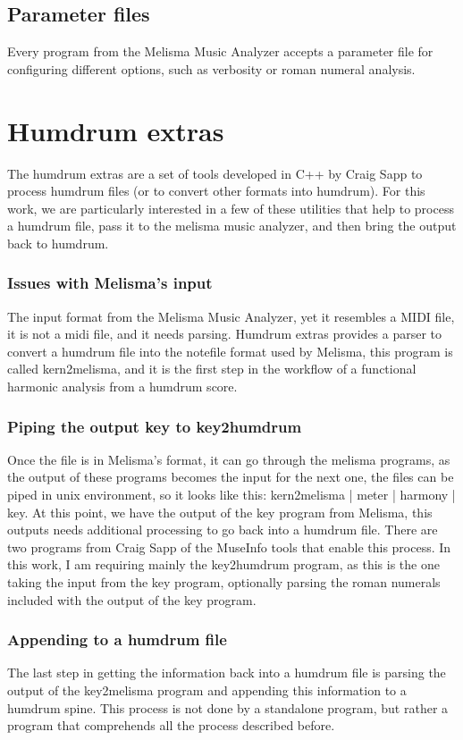  \subsection{Parameter files}
    Every program from the Melisma Music Analyzer accepts a parameter file for configuring different options, such as verbosity or roman numeral analysis.
\section{Humdrum extras}
  The humdrum extras are a set of tools developed in C++ by Craig Sapp to process humdrum files (or to convert other formats into humdrum). For this work, we are particularly interested in a few of these utilities that help to process a humdrum file, pass it to the melisma music analyzer, and then bring the output back to humdrum.
  \subsubsection{Issues with Melisma's input}
    The input format from the Melisma Music Analyzer, yet it resembles a MIDI file, it is not a midi file, and it needs parsing. Humdrum extras provides a parser to convert a humdrum file into the notefile format used by Melisma, this program is called kern2melisma, and it is the first step in the workflow of a functional harmonic analysis from a humdrum score.
  \subsubsection{Piping the output key to key2humdrum}
    Once the file is in Melisma's format, it can go through the melisma programs, as the output of these programs becomes the input for the next one, the files can be piped in unix environment, so it looks like this: kern2melisma | meter | harmony | key.
    At this point, we have the output of the key program from Melisma, this outputs needs additional processing to go back into a humdrum file. There are two programs from Craig Sapp of the MuseInfo tools that enable this process. In this work, I am requiring mainly the key2humdrum program, as this is the one taking the input from the key program, optionally parsing the roman numerals included with the output of the key program.
  \subsubsection{Appending to a humdrum file}
    The last step in getting the information back into a humdrum file is parsing the output of the key2melisma program and appending this information to a humdrum spine. This process is not done by a standalone program, but rather a program that comprehends all the process described before.
